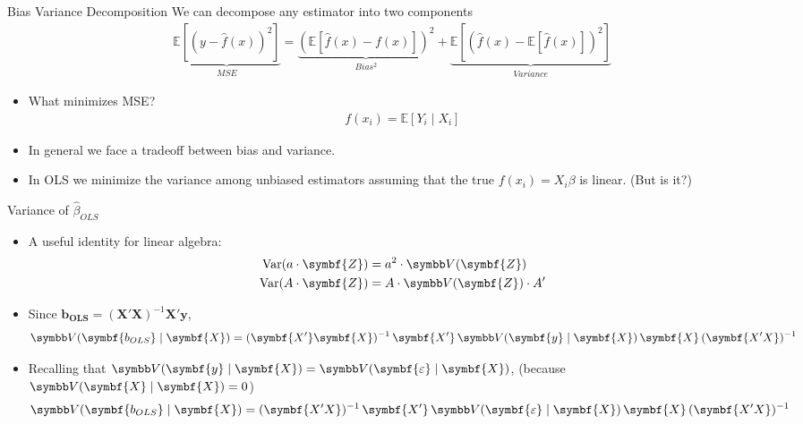 \documentclass[aspectratio=169,11pt]{beamer}
\begin{document}
\begin{frame}{Bias Variance Decomposition}
We can decompose any estimator into two components
\begin{eqnarray*}
\underbrace{\mathbb{E}[(y- \hat{f}(x))^2]}_{MSE} =\underbrace{\left( \mathbb{E}[ \hat{f}(x) - f(x)] \right)^2}_{Bias^2}  +  \underbrace{\mathbb{E} \left[ \left(  \hat{f}(x) - \mathbb{E}[\hat{f}(x)]  \right)^2 \right]}_{Variance} 
\end{eqnarray*}
\begin{itemize}
\item What minimizes MSE?
\begin{eqnarray*}
f(x_i) = \mathbb{E}[Y_i \mid X_i]  
\end{eqnarray*}
\item In general we face a tradeoff between bias and variance.
\item In OLS we minimize the variance among unbiased estimators assuming that the true $f(x_i)= X_i \beta$ is linear. (But is it?)
\end{itemize}
\end{frame}


\begin{frame}{Variance of $\widehat{\beta}_{OLS}$}
\begin{itemize}
	\item A useful identity for linear algebra:
\begin{align*}
\operatorname { Var } (a \cdot \symbf{Z} ) &= a^2 \cdot \Var(\symbf{Z})\\
\operatorname { Var } (A \cdot \symbf{Z} ) &= A \cdot  \Var(\symbf{Z}) \cdot A'
\end{align*}

\smallskip
\item Since $\symbf{b_{OLS}} = (\symbf{X'} \symbf{X} )^{-1} \symbf{X'} \symbf{y}$,
\begin{align*}
\Var (\symbf{b_{OLS}} \mid  \symbf{X}) = (\symbf{X'} \symbf{X} )^{-1} \, \symbf{X'} \, \Var (\symbf{y} \mid \symbf{X}) \,  \symbf{X} \, (\symbf{X'X} )^{-1}
\end{align*}

\smallskip
\item Recalling that $\Var ( \symbf{y} \mid \symbf{X} )  = \Var ( \symbf{\varepsilon}  \mid \symbf{X}  ) $,  (because $\Var( \symbf{X} \mid \symbf{X})=0$)
\begin{align*}
\Var( \symbf{b_{OLS}} \mid \symbf{X}) = (\symbf{X'X})^{-1}\, \symbf{X'}\, \Var ( \symbf{\varepsilon} \mid \symbf { X } ) \, \symbf{X} \, (\symbf{X'X})^{-1}
\end{align*}
\end{itemize}
\end{frame}
\end{document}

